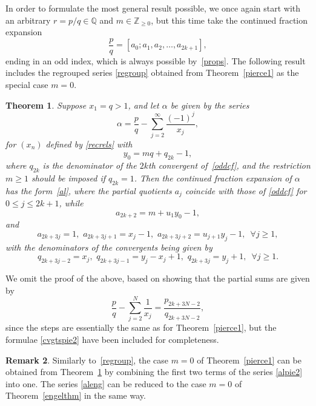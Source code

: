 \documentclass[10pt, a4paper]{amsart}
\numberwithin{equation}{section}
\newcommand\al{{\alpha}}
\theoremstyle{plain}
\newtheorem{thm}{Theorem}[section]
\theoremstyle{definition}
\newtheorem{rem}[thm]{Remark}
\newcommand{\Zo}{\mathbb{Z}_{\ge0}}
\newcommand{\Q}{\mathbb{Q}}
\begin{document}
In order to formulate the most general result possible, we once again 
start with an arbitrary $r=p/q\in\Q$ and $m\in\Zo$, but this time 
take the continued fraction expansion 
\begin{equation}
\label{oddcf} 
\frac{p}{q}=  [a_0;a_1,a_2,\dots,a_{2k+1}], 
\end{equation}  
ending in an odd index, which is always possible by~\eqref{props}. 
The following result includes the regrouped series \eqref{regroup} 
obtained from Theorem~\ref{pierce1} as the special case $m=0$. 
 
\begin{thm}
\label{pierce2} 
Suppose $x_1=q>1$, and let $\al$ be given by the series  
\begin{equation} 
\label{alpie2} 
\al = \frac{p}{q}-\sum_{j=2}^\infty \frac{(-1)^j}{x_j}, 
\end{equation} 
for $(x_n)$ defined by \eqref{recrels} with 
\begin{equation}
\label{y0valpie2}
y_0=mq+q_{2k}-1, 
\end{equation} 
where $q_{2k}$ is the denominator of the $2k$th convergent of~\eqref{oddcf}, 
and the restriction $m\geq 1$ should be imposed if $q_{2k}=1$. 
Then  the continued fraction expansion of $\al$ has the form~\eqref{al}, 
where the partial quotients $a_j$ coincide with those of 
\eqref{oddcf} for $0\leq j\leq 2k+1$, while  
\begin{equation}
\label{pie2cf} 
a_{2k+2}=m+u_1 y_0-1, 
\end{equation} 
and 
\begin{equation}
\label{pie2coeff}
a_{2k+3j}=1, \, \, a_{2k+3j+1}=x_j-1, \, \, a_{2k+3j+2}=u_{j+1}y_j-1, \,\,\, 
\forall j\geq 1, 
\end{equation} 
with the denominators of the convergents being given by 
\begin{equation}
\label{cvgtspie2} 
q_{2k+3j-2}=x_j, \,\, 
q_{2k+3j-1}=y_j-x_j+1, \,\,
q_{2k+3j}=y_j+1, \,\, \, \forall j\geq 1. 
\end{equation} 
\end{thm} 

We omit the proof of the above,  based on showing that the partial sums are given by 
\[ 
\frac{p}{q}-\sum_{j=2}^N \frac{1}{x_j}= \frac{p_{2k+3N-2}}{q_{2k+3N-2}}, 
\] 
since the steps are essentially the same 
as for Theorem~\ref{pierce1}, but the formulae \eqref{cvgtspie2}
have been included for completeness.

\begin{rem} Similarly to~\eqref{regroup}, the case $m=0$ of Theorem~\ref{pierce1} can be 
obtained from Theorem~\ref{pierce2} by combining the first two terms of the series 
\eqref{alpie2} into one. The series \eqref{aleng} can be reduced to the case $m=0$ 
of Theorem~\ref{engelthm} in the same way.
\end{rem}
\end{document}

